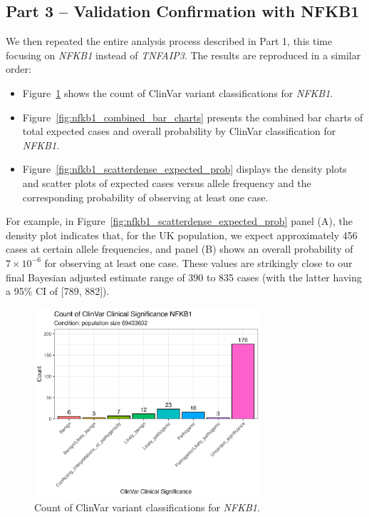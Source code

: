 \documentclass[a4paper,12pt]{article}
\begin{document}
\subsection{Part 3 -- Validation Confirmation with NFKB1}
We then repeated the entire analysis process described in Part 1, this time focusing on \textit{NFKB1} instead of \textit{TNFAIP3}. The results are reproduced in a similar order:
\begin{itemize}
    \item Figure~\ref{fig:nfkb1_clinvar_count} shows the count of ClinVar variant classifications for \textit{NFKB1}.
    \item Figure~\ref{fig:nfkb1_combined_bar_charts} presents the combined bar charts of total expected cases and overall probability by ClinVar classification for \textit{NFKB1}.
    \item Figure~\ref{fig:nfkb1_scatterdense_expected_prob} displays the density plots and scatter plots of expected cases versus allele frequency and the corresponding probability of observing at least one case.
\end{itemize}
For example, in Figure~\ref{fig:nfkb1_scatterdense_expected_prob} panel (A), the density plot indicates that, for the UK population, we expect approximately 456 cases at certain allele frequencies, and panel (B) shows an overall probability of \(7 \times 10^{-6}\) for observing at least one case. These values are strikingly close to our final Bayesian adjusted estimate range of 390 to 835 cases (with the latter having a 95\% CI of [789, 882]).

\begin{figure}[H]
  \centering
  \includegraphics[width=0.75\textwidth]{../images/nfkb1_clinvar_count.png}
  \caption{Count of ClinVar variant classifications for \textit{NFKB1}.}
  \label{fig:nfkb1_clinvar_count}
\end{figure}
\end{document}
